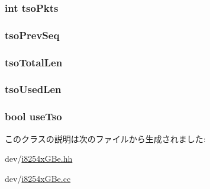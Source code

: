 \label{classIGbE_1_1TxDescCache_a6113e9447ae2e0f5fcea17ac8b4a2fd5}
\hypertarget{classIGbE_1_1TxDescCache_a50260682f8c2508080a0c2c51727b40c}{
\subsubsection[{tsoPkts}]{\setlength{\rightskip}{0pt plus 5cm}int {\bf tsoPkts}}}
\label{classIGbE_1_1TxDescCache_a50260682f8c2508080a0c2c51727b40c}
\hypertarget{classIGbE_1_1TxDescCache_a2906204858e8f7b554a7b5a449bbb4cb}{
\subsubsection[{tsoPrevSeq}]{ {\bf tsoPrevSeq}}}
\label{classIGbE_1_1TxDescCache_a2906204858e8f7b554a7b5a449bbb4cb}
\hypertarget{classIGbE_1_1TxDescCache_a94166f6af145a255d6623ebd93b0c0f5}{
\subsubsection[{tsoTotalLen}]{ {\bf tsoTotalLen}}}
\label{classIGbE_1_1TxDescCache_a94166f6af145a255d6623ebd93b0c0f5}
\hypertarget{classIGbE_1_1TxDescCache_afaeeb9d655b0c19961b86d83fc025ae5}{
\subsubsection[{tsoUsedLen}]{ {\bf tsoUsedLen}}}
\label{classIGbE_1_1TxDescCache_afaeeb9d655b0c19961b86d83fc025ae5}
\hypertarget{classIGbE_1_1TxDescCache_ae2379f1cb19d3eabcb86036c07fc7986}{
\subsubsection[{useTso}]{\setlength{\rightskip}{0pt plus 5cm}bool {\bf useTso}}}
\label{classIGbE_1_1TxDescCache_ae2379f1cb19d3eabcb86036c07fc7986}


このクラスの説明は次のファイルから生成されました:\begin{DoxyCompactItemize}
\item 
dev/\hyperlink{i8254xGBe_8hh}{i8254xGBe.hh}\item 
dev/\hyperlink{i8254xGBe_8cc}{i8254xGBe.cc}\end{DoxyCompactItemize}
